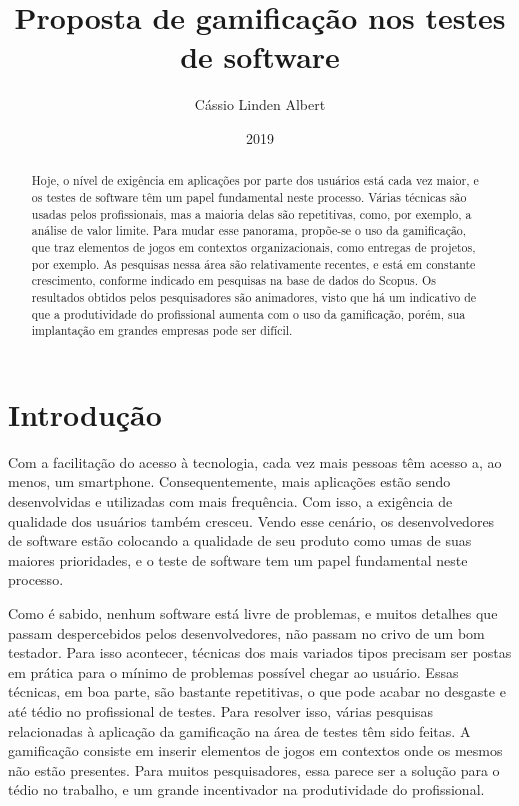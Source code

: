 \documentclass[twoside,english,brazilian]{UNISINOSartigo}
\title{Proposta de gamificação nos testes de software}
\author{Cássio Linden Albert}
\date{2019}
\begin{document}
\maketitle

%
\begin{abstract}

Hoje, o nível de exigência em aplicações por parte dos usuários está cada vez maior, e os testes de software têm um papel fundamental neste processo. Várias técnicas são usadas pelos profissionais, mas a maioria delas são repetitivas, como, por exemplo, a análise de valor limite. Para mudar esse panorama, propõe-se o uso da gamificação, que traz elementos de jogos em contextos organizacionais, como entregas de projetos, por exemplo. As pesquisas nessa área são relativamente recentes, e está em constante crescimento, conforme indicado em pesquisas na base de dados do Scopus. Os resultados obtidos pelos pesquisadores são animadores, visto que há um indicativo de que a produtividade do profissional aumenta com o uso da gamificação, porém, sua implantação em grandes empresas pode ser difícil.
\end{abstract}

\section{Introdução}

Com a facilitação do acesso à tecnologia, cada vez mais pessoas têm acesso a, ao menos, um smartphone. Consequentemente, mais aplicações estão sendo desenvolvidas e utilizadas com mais frequência. Com isso, a exigência de qualidade dos usuários também cresceu. Vendo esse cenário, os desenvolvedores de software estão colocando a qualidade de seu produto como umas de suas maiores prioridades, e o teste de software tem um papel fundamental neste processo.

Como é sabido, nenhum software está livre de problemas, e muitos detalhes que passam despercebidos pelos desenvolvedores, não passam no crivo de um bom testador. Para isso acontecer, técnicas dos mais variados tipos precisam ser postas em prática para o mínimo de problemas possível chegar ao usuário. Essas técnicas, em boa parte, são bastante repetitivas, o que pode acabar no desgaste e até tédio no profissional de testes. Para resolver isso, várias pesquisas relacionadas à aplicação da gamificação na área de testes têm sido feitas. A gamificação consiste em inserir elementos de jogos em contextos onde os mesmos não estão presentes. Para muitos pesquisadores, essa parece ser a solução para o tédio no trabalho, e um grande incentivador na produtividade do profissional.
\end{document}
